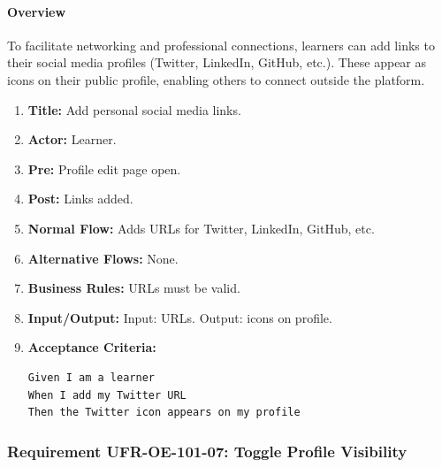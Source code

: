 \paragraph{Overview}
To facilitate networking and professional connections, learners can add links to their social media profiles (Twitter, LinkedIn, GitHub, etc.). These appear as icons on their public profile, enabling others to connect outside the platform.
\begin{enumerate}[label=\textbf{\arabic*.}]
\item \textbf{Title:} Add personal social media links.
\item \textbf{Actor:} Learner.
\item \textbf{Pre:} Profile edit page open.
\item \textbf{Post:} Links added.
\item \textbf{Normal Flow:} Adds URLs for Twitter, LinkedIn, GitHub, etc.
\item \textbf{Alternative Flows:} None.
\item \textbf{Business Rules:} URLs must be valid.
\item \textbf{Input/Output:} Input: URLs. Output: icons on profile.
\item \textbf{Acceptance Criteria:}
    \begin{verbatim}
Given I am a learner
When I add my Twitter URL
Then the Twitter icon appears on my profile
    \end{verbatim}
\end{enumerate}

\subsubsection{Requirement UFR-OE-101-07: Toggle Profile Visibility}

